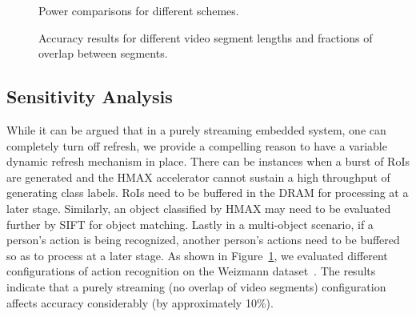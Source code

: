 \begin{figure}[ht!]
\begin{minipage}[t]{0.48\linewidth}
\centering
{}
\caption{\label{fig:PowerResults} Power comparisons for different schemes.}
\end{minipage}
\hspace{0.1in}
\begin{minipage}[t]{0.48\linewidth}
\centering
{}
\caption{\label{fig:ActionRecognition} Accuracy results for different video segment lengths and fractions of overlap between segments.}
\end{minipage}
\vspace{-0.2in}
\end{figure}

\subsection{Sensitivity Analysis}
While it can be argued that in a purely streaming embedded system, one can completely turn off refresh, we provide a compelling reason to have a variable dynamic refresh mechanism in place. There can be instances when a burst of RoIs are generated and the HMAX accelerator cannot sustain a high throughput of generating class labels. RoIs need to be buffered in the DRAM for processing at a later stage. Similarly, an object classified by HMAX may need to be evaluated further by SIFT for object matching. Lastly in a multi-object scenario, if a person's action is being recognized, another person's actions need to be buffered so as to process at a later stage. As shown in Figure~\ref{fig:ActionRecognition}, we evaluated different configurations of action recognition on the Weizmann dataset~\cite{Weizmann}. The results indicate that a purely streaming (no overlap of video segments) configuration affects accuracy considerably (by approximately 10\%).  



